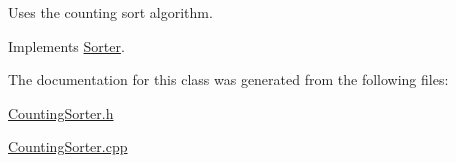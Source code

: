Uses the counting sort algorithm. 

Implements \hyperlink{class_sorter_a946276dc986c9f017e84986c74e7cf18}{Sorter}.



The documentation for this class was generated from the following files\+:\begin{DoxyCompactItemize}
\item 
\hyperlink{_counting_sorter_8h}{Counting\+Sorter.\+h}\item 
\hyperlink{_counting_sorter_8cpp}{Counting\+Sorter.\+cpp}\end{DoxyCompactItemize}
